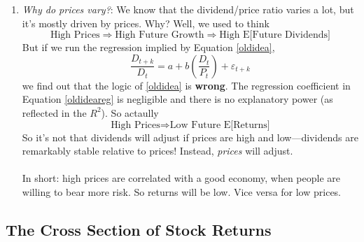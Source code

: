 \documentclass[a4paper,12pt]{scrartcl}
\begin{document}
\begin{enumerate}
	Recall that it was puzzling
	that stocks should earn 7\% over bonds. Now we're saying that
	they earn 7\% over bonds \emph{and} vary with a standard
	deviation of about 6\% a year. Average \emph{changes} in
	$ER^e_{t\rightarrow t+k}$ are about as much as the average
	confounding \emph{level}.\footnote{Of course, \emph{actual}
	returns vary even more than expected returns---recall about
	17\%.}
    \item {\sl Why do prices vary?}: We know that the dividend/price
	ratio varies a lot, but it's mostly driven by prices. Why?
	Well, we used to think
	\begin{equation}
	    \label{oldidea}
	    \text{High Prices} \Rightarrow \text{High Future Growth}
		\Rightarrow \text{High E[Future Dividends]}
	\end{equation}
	But if we run the regression implied by Equation \ref{oldidea},
	\begin{equation}
	    \label{oldideareg}
	    \frac{D_{t+k}}{D_t} = a + b \left(\frac{D_t}{P_t}\right)
		+ \varepsilon_{t+k}
	\end{equation}
	we find out that the logic of \ref{oldidea} is \textbf{wrong}.
	The regression coefficient in Equation \ref{oldideareg} is
	negligible and there is no explanatory power (as
	reflected in the $R^2$).  So actaully
	\begin{equation}
	    \label{newidea}
	    \text{High Prices} \Rightarrow \text{Low Future E[Returns]}
	\end{equation}
	So it's not that dividends will adjust if prices are high
	and low---dividends are remarkably stable relative to prices!
	Instead, \emph{prices} will adjust.
	\\
	\\
	In short: high prices are correlated with a good economy,
	when people are willing to bear more risk.  So returns will
	be low. Vice versa for low prices.
\end{enumerate}


\subsection{The Cross Section of Stock Returns}
\end{document}
